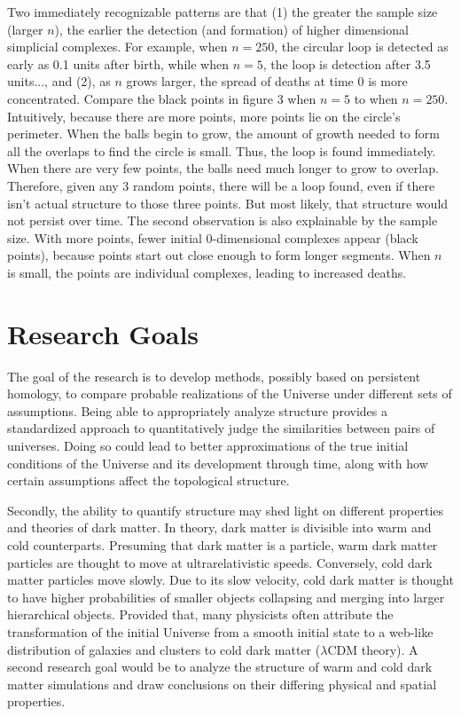 \documentclass[12pt]{article}
\begin{document}
Two immediately recognizable patterns are that (1) the greater the sample size (larger $n$), the earlier the detection (and formation) of higher dimensional simplicial complexes. For example, when $n = 250$, the circular loop is detected as early as 0.1 units after birth, while when $n = 5$, the loop is detection after 3.5 units..., and (2), as $n$ grows larger, the spread of deaths at time 0 is more concentrated. Compare the black points in figure 3 when $n = 5$ to when $n = 250$. Intuitively, because there are more points, more points lie on the circle's perimeter. When the balls begin to grow, the amount of growth needed to form all the overlaps to find the circle is small. Thus, the loop is found immediately. When there are very few points, the balls need much longer to grow to overlap. Therefore, given any 3 random points, there will be a loop found, even if there isn't actual structure to those three points. But most likely, that structure would not persist over time. The second observation is also explainable by the sample size. With more points, fewer initial 0-dimensional complexes appear (black points), because points start out close enough to form longer segments. When $n$ is small, the points are individual complexes, leading to increased deaths.

\section{Research Goals}
The goal of the research is to develop methods, possibly based on persistent homology, to compare probable realizations of the Universe under different sets of assumptions. Being able to appropriately analyze structure provides a standardized approach to quantitatively judge the similarities between pairs of universes. Doing so could lead to better approximations of the true initial conditions of the Universe and its development through time, along with how certain assumptions affect the topological structure.

Secondly, the ability to quantify structure may shed light on different properties and theories of dark matter. In theory, dark matter is divisible into warm and cold counterparts. Presuming that dark matter is a particle, warm dark matter particles are thought to move at ultrarelativistic speeds. Conversely, cold dark matter particles move slowly. Due to its slow velocity, cold dark matter is thought to have higher probabilities of smaller objects collapsing and merging into larger hierarchical objects. Provided that, many physicists often attribute the transformation of the initial Universe from a smooth initial state to a web-like distribution of galaxies and clusters to cold dark matter ($\lambda$CDM theory). A second research goal would be to analyze the structure of warm and cold dark matter simulations and draw conclusions on their differing physical and spatial properties. 
\end{document}
